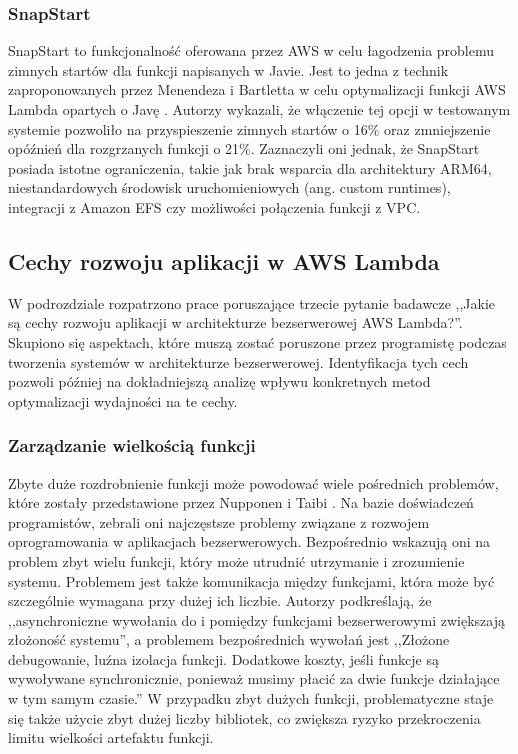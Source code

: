\subsubsection*{SnapStart}

SnapStart to funkcjonalność oferowana przez AWS w celu łagodzenia problemu zimnych startów dla funkcji napisanych w Javie. 
Jest to jedna z technik zaproponowanych przez Menendeza i Bartletta w celu optymalizacji funkcji AWS Lambda opartych o Javę \cite{menéndez2023performancebestpracticesusing}. 
Autorzy wykazali, że włączenie tej opcji w testowanym systemie pozwoliło na przyspieszenie zimnych startów o 16\% oraz zmniejszenie opóźnień dla rozgrzanych funkcji o 21\%. 
Zaznaczyli oni jednak, że SnapStart posiada istotne ograniczenia, takie jak brak wsparcia dla architektury ARM64, niestandardowych środowisk uruchomieniowych (ang. custom runtimes), integracji z Amazon EFS czy możliwości połączenia funkcji z VPC.

\subsection{Cechy rozwoju aplikacji w AWS Lambda}\label{chapter:przeglad_literatury_wyniki_cechy_rozwoju}

W podrozdziale rozpatrzono prace poruszające trzecie pytanie badawcze ,,Jakie są cechy rozwoju aplikacji w architekturze bezserwerowej AWS Lambda?''.
Skupiono się aspektach, które muszą zostać poruszone przez programistę podczas tworzenia systemów w architekturze bezserwerowej.
Identyfikacja tych cech pozwoli później na dokładniejszą analizę wpływu konkretnych metod optymalizacji wydajności na te cechy.

\subsubsection*{Zarządzanie wielkością funkcji}

Zbyte duże rozdrobnienie funkcji może powodować wiele pośrednich problemów, które zostały przedstawione przez Nupponen i Taibi \cite{9095731}.
Na bazie doświadczeń programistów, zebrali oni najczęstsze problemy związane z rozwojem oprogramowania w aplikacjach bezserwerowych.
Bezpośrednio wskazują oni na problem zbyt wielu funkcji, który może utrudnić utrzymanie i zrozumienie systemu.
Problemem jest także komunikacja między funkcjami, która może być szczególnie wymagana przy dużej ich liczbie. 
Autorzy podkreślają, że ,,asynchroniczne wywołania do i pomiędzy funkcjami bezserwerowymi zwiększają złożoność systemu''\cite{9095731}, 
a problemem bezpośrednich wywołań jest ,,Złożone debugowanie, luźna izolacja funkcji. Dodatkowe koszty, jeśli funkcje są wywoływane synchronicznie, ponieważ musimy płacić za dwie funkcje działające w tym samym czasie.''\cite{9095731}
W przypadku zbyt dużych funkcji, problematyczne staje się także użycie zbyt dużej liczby bibliotek, co zwiększa ryzyko przekroczenia limitu wielkości artefaktu funkcji.

